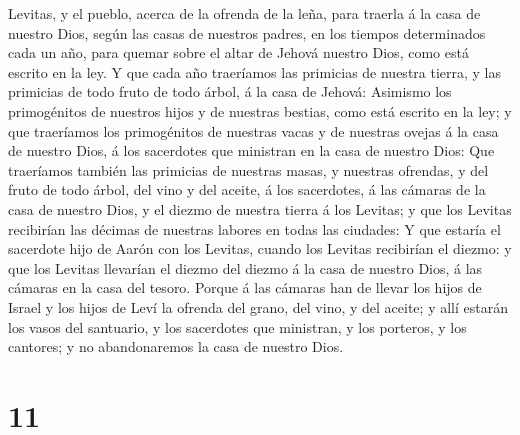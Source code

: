 Levitas, y el pueblo, acerca de la ofrenda de la leña, para traerla á la
casa de nuestro Dios, según las casas de nuestros padres, en los tiempos
determinados cada un año, para quemar sobre el altar de Jehová nuestro
Dios, como está escrito en la ley.  Y que cada año
traeríamos las primicias de nuestra tierra, y las primicias de todo
fruto de todo árbol, á la casa de Jehová:  Asimismo los
primogénitos de nuestros hijos y de nuestras bestias, como está escrito
en la ley; y que traeríamos los primogénitos de nuestras vacas y de
nuestras ovejas á la casa de nuestro Dios, á los sacerdotes que
ministran en la casa de nuestro Dios:  Que traeríamos
también las primicias de nuestras masas, y nuestras ofrendas, y del
fruto de todo árbol, del vino y del aceite, á los sacerdotes, á las
cámaras de la casa de nuestro Dios, y el diezmo de nuestra tierra á los
Levitas; y que los Levitas recibirían las décimas de nuestras labores en
todas las ciudades:  Y que estaría el sacerdote hijo de
Aarón con los Levitas, cuando los Levitas recibirían el diezmo: y que
los Levitas llevarían el diezmo del diezmo á la casa de nuestro Dios, á
las cámaras en la casa del tesoro.  Porque á las cámaras
han de llevar los hijos de Israel y los hijos de Leví la ofrenda del
grano, del vino, y del aceite; y allí estarán los vasos del santuario, y
los sacerdotes que ministran, y los porteros, y los cantores; y no
abandonaremos la casa de nuestro Dios.

\hypertarget{section-10}{%
\section{11}\label{section-10}}


